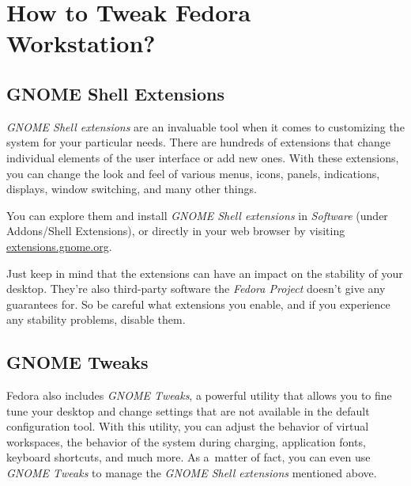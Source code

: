 \chapter*{How to Tweak Fedora Workstation?}
\section*{GNOME Shell Extensions}

\emph{GNOME Shell extensions} are an invaluable tool when it comes to customizing the system for your particular needs. There are hundreds of extensions that change individual elements of the user interface or add new ones. With these extensions, you can change the look and feel of various menus, icons, panels, indications, displays, window switching, and many other things.

You can explore them and install \emph{GNOME Shell extensions} in \emph{Software} (under Addons/Shell Extensions), or directly in your web browser by visiting \url{extensions.gnome.org}.

Just keep in mind that the extensions can have an impact on the stability of your desktop. They're also third-party software the \emph{Fedora Project} doesn't give any guarantees for. So be careful what extensions you enable, and if you experience any stability problems, disable them.

\section*{GNOME Tweaks}

Fedora also includes \emph{GNOME Tweaks}, a powerful utility that allows you to fine tune your desktop and change settings that are not available in the default configuration tool. With this utility, you can adjust the behavior of virtual workspaces, the behavior of the system during charging, application fonts, keyboard shortcuts, and much more. As a~matter of fact, you can even use \emph{GNOME Tweaks} to manage the \emph{GNOME Shell extensions} mentioned above.
\endinput

